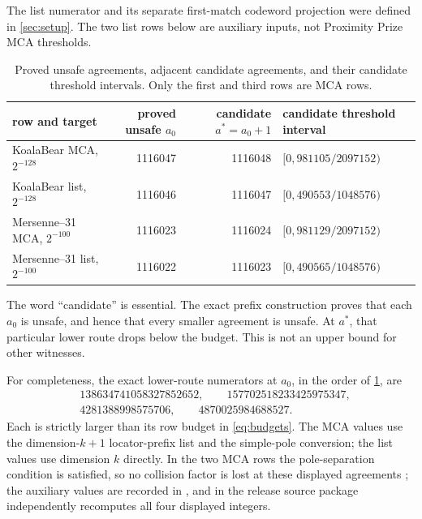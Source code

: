 \documentclass[a4paper,11pt]{amsart}
\theoremstyle{remark}
\begin{document}
The list numerator and its separate first-match codeword projection were
defined in \cref{sec:setup}.  The two list rows below are auxiliary inputs,
not Proximity Prize MCA thresholds.

\begin{table}[t]
\centering
\small
\caption{Proved unsafe agreements, adjacent candidate agreements, and their
candidate threshold intervals.  Only the first and third rows are MCA
rows.}\label{tab:benchmark}
\begin{tabular}{@{}lrrl@{}}
\toprule
row and target & proved unsafe \(a_0\) & candidate \(a^*=a_0+1\)
& candidate threshold interval\\
\midrule
KoalaBear MCA, \(2^{-128}\) &1116047&1116048&
\([0,981105/2097152)\)\\
KoalaBear list, \(2^{-128}\)&1116046&1116047&
\([0,490553/1048576)\)\\
Mersenne--31 MCA, \(2^{-100}\)&1116023&1116024&
\([0,981129/2097152)\)\\
Mersenne--31 list, \(2^{-100}\)&1116022&1116023&
\([0,490565/1048576)\)\\
\bottomrule
\end{tabular}
\end{table}

The word ``candidate'' is essential.  The exact prefix construction proves
that each \(a_0\) is unsafe, and hence that every smaller agreement is unsafe.
At \(a^*\), that particular lower route drops below the budget.  This is not
an upper bound for other witnesses.

For completeness, the exact lower-route numerators at \(a_0\), in the order
of \cref{tab:benchmark}, are
\[
 \begin{aligned}
  &138634741058327852652,\qquad157702518233425975347,\\
  &4281388998575706,\qquad4870025984688527.
 \end{aligned}                                      \tag{5.2}\label{eq:unsafe-lower-values}
\]
Each is strictly larger than its row budget in \eqref{eq:budgets}.  The MCA
values use the dimension-\(k+1\) locator-prefix list and the simple-pole
conversion; the list values use dimension \(k\) directly.  In the two MCA
rows the pole-separation condition is satisfied, so no collision factor is
lost at these displayed agreements \cite[Proposition~8.6]{ChoShortening};
the auxiliary values are recorded in \cite{RSMCARepo}, and
 in the release source package independently
recomputes all four displayed integers.
\end{document}
